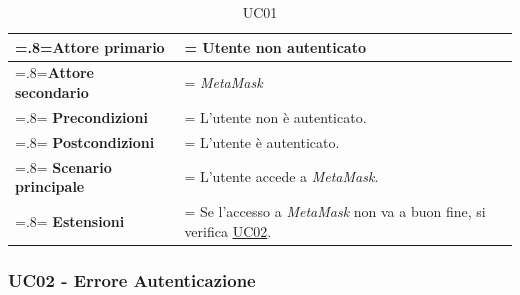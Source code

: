             \begin{table}[H]
                \centering
                \renewcommand{\arraystretch}{1.8}
                \renewcommand\tabularxcolumn[1]{m{#1}}
                \begin{tabularx}{0.9\textwidth} {
                    >{\hsize=.8\hsize\linewidth=\hsize}X
                    >{\hsize=1.2\hsize\linewidth=\hsize}X}
                    \hline
                    \textbf{Attore primario} & Utente non autenticato \\
                    \hline
                    \textbf{Attore secondario} & \textit{MetaMask} \\
                    \hline
                    \textbf{Precondizioni} & L'utente non è autenticato. \\
                    \hline
                    \textbf{Postcondizioni} & L'utente è autenticato. \\
                    \hline
                    \textbf{Scenario principale} & L'utente accede a \textit{MetaMask}. \\
                    \hline
                    \textbf{Estensioni} & Se l'accesso a \textit{MetaMask} non va a buon fine, si verifica \hyperref[UC02]{UC02}. \\
                    \hline
                \end{tabularx}
                \caption{UC01}
            \end{table}

            \subsubsection{UC02 - Errore Autenticazione}
            \label{UC02}
    
